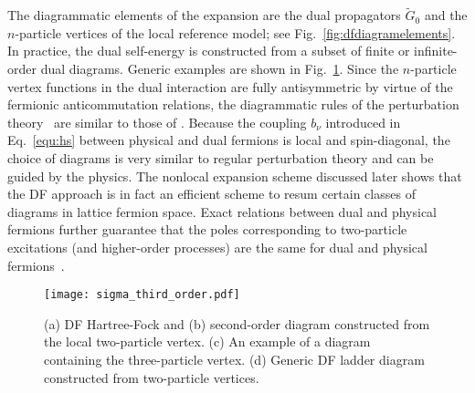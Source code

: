 \documentclass[rmp,aps,reprint,amsmath,amssymb,superscriptaddress,showpacs,nofootinbib]{revtex4-1}
\begin{document}
The diagrammatic elements of the expansion are the dual propagators $\widetilde{G}_{0}$ and the $n$-particle vertices of the local reference model; see Fig.~\ref{fig:dfdiagramelements}. In practice, the dual self-energy is constructed from a subset of finite or infinite-order dual diagrams. Generic examples are shown in Fig.~\ref{fig:dfsecondorder}. Since the $n$-particle vertex functions in the dual interaction are fully antisymmetric by virtue of the fermionic anticommutation relations, the diagrammatic rules of the perturbation theory~\cite{Negele1998,Hafermannphd} are similar to those of . Because the coupling $b_{\nu}$ introduced in Eq.~\eqref{equ:hs} between physical and dual fermions is local and spin-diagonal, the choice of diagrams is very similar to regular perturbation theory and can be guided by the physics. The nonlocal expansion scheme discussed later shows that the DF approach is in fact an efficient scheme to resum certain classes of diagrams in lattice fermion space. Exact relations between dual and physical fermions further guarantee that the poles corresponding to two-particle excitations (and higher-order processes) are the same for dual and physical fermions~\cite{Brener08}.

\begin{figure}[t!]
  \centering
  \texttt{[image: sigma\_third\_order.pdf]}
    \caption{(a) DF Hartree-Fock and (b) second-order diagram constructed from the local two-particle vertex. (c) An example of a diagram containing the three-particle vertex. (d) Generic DF ladder diagram constructed from two-particle vertices.}
  \label{fig:dfsecondorder}
\end{figure}
\end{document}
